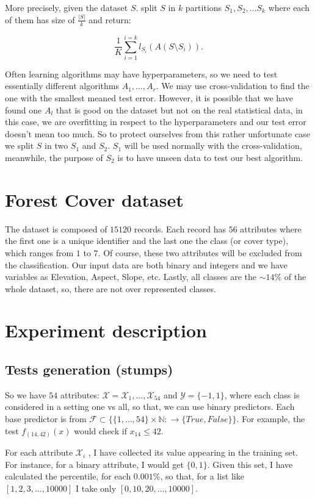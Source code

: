\documentclass{article}
\begin{document}
More precisely, given the dataset $S$. split $S$ in $k$ partitions $S_1, S_2, \dots S_k$ where each of them 
has size of $\frac{|S|}{k}$ and return:

$$\frac{1}{K}\sum_{i=1}^{i=k} l_{S_i}(A(S\setminus S_i)).$$

Often learning algorithms may have hyperparameters, so we need to test essentially different algorithms $A_1,\dots,A_r$.
We may use cross-validation to find the one with the smallest meaned test error. However,
it is possible that we have found one $A_l$ that is good on the dataset but not on the real statistical data,
in this case, we are overfitting in respect to the hyperparameters and our test error doesn't mean too much. 
So to protect ourselves from this rather unfortunate case we split $S$ in two $S_1$ and $S_2$.
$S_1$ will be used normally with the cross-validation, meanwhile, the purpose of $S_2$ is to have
unseen data to test our best algorithm.

\section{Forest Cover dataset}

The dataset is composed of $15120$ records. Each record has $56$ attributes where the first one
is a unique identifier and the last one the class (or cover type), which ranges from $1$ to $7$.
Of course, these two attributes will be excluded from the classification.
Our input data are both binary and integers and we have variables as Elevation, Aspect, Slope, etc.
Lastly, all classes are the $\sim 14\%$ of the whole dataset, so, there are not over represented classes.

\section{Experiment description}
\subsection{Tests generation (stumps)}
So we have $54$ attributes: $\mathcal{X} = \mathcal{X}_1, \dots,\mathcal{X}_{54}$ and $\mathcal{Y} = \{-1,1\}$, where
each class is considered in a setting one vs all, so that, we can use binary predictors.
Each base predictor is from $ \mathcal{F} \subset \{\{1,\dots,54\}\times \mathbb{N}: \rightarrow \{True,False\}\}$.
For example, the test $f_{(14,42)}(x)$ would check if $x_{14} \leq 42$.

For each attribute $\mathcal{X}_i$ , I have collected its value appearing in the training set.
For instance, for a binary attribute, I would get $\{0,1\}$. Given this set, I have
calculated the percentile, for each $0.001\%$, so that, for a list like $[1,2,3,\dots,10000]$
I take only $[0,10,20,\dots,10000]$.
\end{document}

